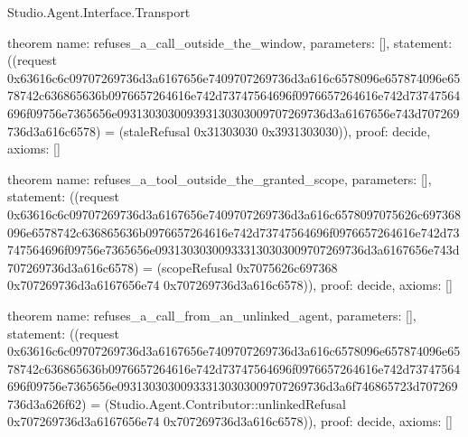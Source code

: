 \begin{lexlean}{Studio.Agent.Interface.Transport}
\begin{semanticmodule}
theorem{
  name: refuses_a_call_outside_the_window,
  parameters: [],
  statement: ((request 0x63616c6c09707269736d3a6167656e7409707269736d3a616c6578096e657874096e6578742c636865636b0976657264616e742d73747564696f0976657264616e742d73747564696f09756e7365656e093130303009393130303009707269736d3a6167656e743d707269736d3a616c6578) = (staleRefusal 0x31303030 0x3931303030)),
  proof: decide{},
  axioms: []
}

theorem{
  name: refuses_a_tool_outside_the_granted_scope,
  parameters: [],
  statement: ((request 0x63616c6c09707269736d3a6167656e7409707269736d3a616c6578097075626c697368096e6578742c636865636b0976657264616e742d73747564696f0976657264616e742d73747564696f09756e7365656e093130303009333130303009707269736d3a6167656e743d707269736d3a616c6578) = (scopeRefusal 0x7075626c697368 0x707269736d3a6167656e74 0x707269736d3a616c6578)),
  proof: decide{},
  axioms: []
}

theorem{
  name: refuses_a_call_from_an_unlinked_agent,
  parameters: [],
  statement: ((request 0x63616c6c09707269736d3a6167656e7409707269736d3a616c6578096e657874096e6578742c636865636b0976657264616e742d73747564696f0976657264616e742d73747564696f09756e7365656e093130303009333130303009707269736d3a6f746865723d707269736d3a626f62) = (Studio.Agent.Contributor::unlinkedRefusal 0x707269736d3a6167656e74 0x707269736d3a616c6578)),
  proof: decide{},
  axioms: []
}
\end{semanticmodule}
\end{lexlean}
